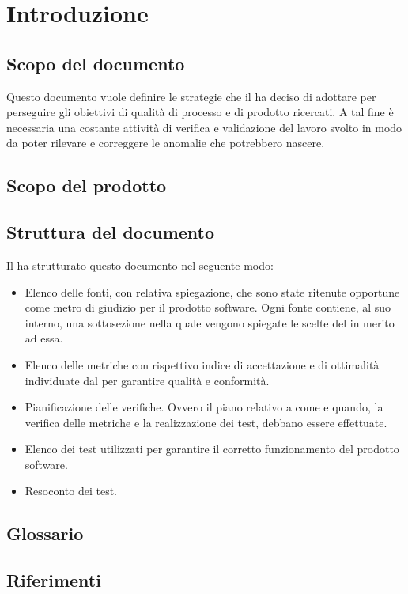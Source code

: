 \section{Introduzione}
\subsection{Scopo del documento}
Questo documento vuole definire le strategie che il  ha deciso di adottare per perseguire gli obiettivi di qualità di processo e di prodotto ricercati. A tal fine è necessaria una costante attività di verifica e validazione del lavoro svolto in modo da poter rilevare e correggere le anomalie che potrebbero nascere.

\subsection{Scopo del prodotto}
\scopoProdotto

\subsection{Struttura del documento}
Il  ha strutturato questo documento nel seguente modo:
\begin{itemize}
\item Elenco delle fonti, con relativa spiegazione, che sono state ritenute opportune come metro di giudizio per il prodotto software. Ogni fonte contiene, al suo interno, una sottosezione nella quale vengono spiegate le scelte del  in merito ad essa.
\item Elenco delle metriche con rispettivo indice di accettazione e di ottimalità individuate dal  per garantire qualità e conformità.
\item Pianificazione delle verifiche. Ovvero il piano relativo a come e quando, la verifica delle metriche e la realizzazione dei test, debbano essere effettuate.
\item Elenco dei test utilizzati per garantire il corretto funzionamento del prodotto software.
\item Resoconto dei test.
\end{itemize}

\subsection{Glossario}
\descrizioneGlossario

\subsection{Riferimenti}
